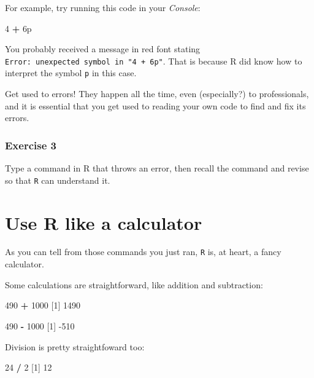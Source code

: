 \documentclass[
]{book}
\newenvironment{Shaded}{\begin{snugshade}}{\end{snugshade}}
\newcommand{\DecValTok}[1]{\textcolor[rgb]{0.00,0.00,0.81}{#1}}
\newcommand{\NormalTok}[1]{#1}
\newcommand{\OperatorTok}[1]{\textcolor[rgb]{0.81,0.36,0.00}{\textbf{#1}}}
\newcommand{\StringTok}[1]{\textcolor[rgb]{0.31,0.60,0.02}{#1}}
\begin{document}
For example, try running this code in your \emph{Console}:

\begin{Shaded}
\begin{Highlighting}[]
\DecValTok{4} \OperatorTok{+}\StringTok{ }\NormalTok{6p}
\end{Highlighting}
\end{Shaded}

You probably received a message in red font stating \texttt{Error:\ unexpected\ symbol\ in\ "4\ +\ 6p"}. That is because R did know how to interpret the symbol \texttt{p} in this case.

Get used to errors! They happen all the time, even (especially?) to professionals, and it is essential that you get used to reading your own code to find and fix its errors.

\hypertarget{exercise-3}{%
\subsubsection*{Exercise 3}\label{exercise-3}}

Type a command in R that throws an error, then recall the command and revise so that \texttt{R} can understand it.

\hypertarget{use-r-like-a-calculator}{%
\section*{Use R like a calculator}\label{use-r-like-a-calculator}}

As you can tell from those commands you just ran, \texttt{R} is, at heart, a fancy calculator.

Some calculations are straightforward, like addition and subtraction:

\begin{Shaded}
\begin{Highlighting}[]
\DecValTok{490} \OperatorTok{+}\StringTok{ }\DecValTok{1000}
\NormalTok{[}\DecValTok{1}\NormalTok{] }\DecValTok{1490}

\DecValTok{490} \OperatorTok{-}\StringTok{ }\DecValTok{1000}
\NormalTok{[}\DecValTok{1}\NormalTok{] }\DecValTok{-510}
\end{Highlighting}
\end{Shaded}

Division is pretty straightfoward too:

\begin{Shaded}
\begin{Highlighting}[]
\DecValTok{24} \OperatorTok{/}\StringTok{ }\DecValTok{2}
\NormalTok{[}\DecValTok{1}\NormalTok{] }\DecValTok{12}
\end{Highlighting}
\end{Shaded}
\end{document}
